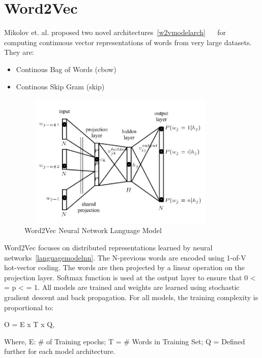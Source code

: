 \section{Word2Vec}
Mikolov et. al. proposed two novel architectures~\autoref{w2vmodelarch} ~\parencite{mikolov1}~\parencite{mikolov2}  for computing continuous vector representations of words from very large datasets. They are:
\begin{itemize}
\item Continous Bag of Words (cbow)
\item Continous Skip Gram (skip)
\end{itemize}

\begin{figure}[ht!]
	\centering
		\includegraphics[height=65mm,  width=100mm]{figures/4_languagemodelnn.png}
		\caption[Word2Vec Neural Network Model]{Word2Vec Neural Network Language Model}
			\label{languagemodelnn}
\end{figure}


Word2Vec focuses on distributed representations learned by neural networks~\autoref{languagemodelnn}.  The N-previous words are encoded using 1-of-V hot-vector coding. The words are then projected by a linear operation on the projection layer. Softmax function is used at the output layer to ensure that 0 < = p < = 1. All models are trained and weights are learned using stochastic gradient descent and back propagation. For all models, the training complexity is proportional to:
\begin{center}
 O = E x T x Q,
 \end{center} 
Where, E: \# of Training epochs; T = \# Words in Training Set; Q = Defined further for each model architecture. 

